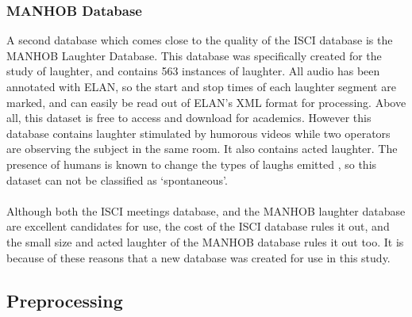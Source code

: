 \documentclass[a4paper,11pt,notitlepage]{article}
\begin{document}
\subsubsection{MANHOB Database}
A second database which comes close to the quality of the ISCI database is the MANHOB Laughter Database. This database was specifically created for the study of laughter, and contains 563 instances of laughter. All audio has been annotated with ELAN\cite{sloetjes2008annotation}, so the start and stop times of each laughter segment are marked, and can easily be read out of ELAN's XML format for processing. Above all, this dataset is free to access and download for academics. However this database contains laughter stimulated by humorous videos while two operators are observing the subject in the same room. It also contains acted laughter. The presence of humans is known to change the types of laughs emitted \cite{campbell2007whom}, so this dataset can not be classified as `spontaneous'.\\
\\
Although both the ISCI meetings database, and the MANHOB laughter database are excellent candidates for use, the cost of the ISCI database rules it out, and the small size and acted laughter of the MANHOB database rules it out too. It is because of these reasons that a new database was created for use in this study.

\subsection{Preprocessing}

\end{document}

